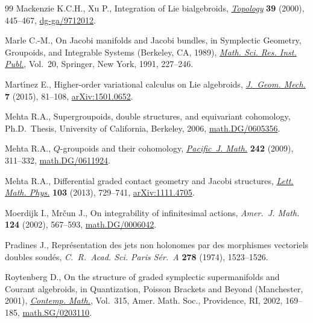 \documentclass[pdftex]{sigma}
\numberwithin{equation}{section}
\begin{document}
\begin{thebibliography}{99}
Mackenzie K.C.H., Xu P., Integration of {L}ie bialgebroids, \href{http://dx.doi.org/10.1016/S0040-9383(98)00069-X}{\textit{Topology}}
  \textbf{39} (2000), 445--467, \href{http://arxiv.org/abs/dg-ga/9712012}{dg-ga/9712012}.

Marle C.-M., On {J}acobi manifolds and {J}acobi bundles, in Symplectic Geometry,
  Groupoids, and Integrable Systems ({B}erkeley, {CA}, 1989), \href{http://dx.doi.org/10.1007/978-1-4613-9719-9_16}{\textit{Math.
  Sci. Res. Inst. Publ.}}, Vol.~20, Springer, New York, 1991, 227--246.

Mart{\'{\i}}nez E., Higher-order variational calculus on {L}ie algebroids,
  \href{http://dx.doi.org/10.3934/jgm.2015.7.81}{\textit{J.~Geom. Mech.}} \textbf{7} (2015), 81--108, \href{http://arxiv.org/abs/1501.0652}{arXiv:1501.0652}.

Mehta R.A., Supergroupoids, double structures, and equivariant cohomology,
  Ph.D.~Thesis, University of California, Berkeley, 2006,
  \href{http://arxiv.org/abs/math.DG/0605356}{math.DG/0605356}.

Mehta R.A., {$Q$}-groupoids and their cohomology, \href{http://dx.doi.org/10.2140/pjm.2009.242.311}{\textit{Pacific~J. Math.}}
  \textbf{242} (2009), 311--332, \href{http://arxiv.org/abs/math.DG/0611924}{math.DG/0611924}.

Mehta R.A., Dif\/ferential graded contact geometry and {J}acobi structures,
  \href{http://dx.doi.org/10.1007/s11005-013-0609-6}{\textit{Lett. Math. Phys.}} \textbf{103} (2013), 729--741, \href{http://arxiv.org/abs/1111.4705}{arXiv:1111.4705}.

Moerdijk I., Mr{\v{c}}un J., On integrability of inf\/initesimal actions,
  \textit{Amer.~J. Math.} \textbf{124} (2002), 567--593,
  \href{http://arxiv.org/abs/math.DG/0006042}{math.DG/0006042}.

Pradines J., Repr\'esentation des jets non holonomes par des morphismes
  vectoriels doubles soud\'es, \textit{C.~R.~Acad. Sci. Paris S\'er.~A}
  \textbf{278} (1974), 1523--1526.

Roytenberg D., On the structure of graded symplectic supermanifolds and
  {C}ourant algebroids, in Quantization, {P}oisson Brackets and Beyond
  ({M}anchester, 2001), \href{http://dx.doi.org/10.1090/conm/315/05479}{\textit{Contemp. Math.}}, Vol.~315, Amer. Math. Soc.,
  Providence, RI, 2002, 169--185, \href{http://arxiv.org/abs/math.SG/0203110}{math.SG/0203110}.


\end{thebibliography}
\end{document}

